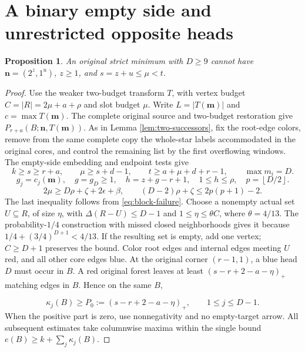 \documentclass[11pt,a4paper]{article}
\newcommand{\nn}{\mathbf n}\newcommand{\mm}{\mathbf m}
\newcommand{\floor}[1]{\left\lfloor#1\right\rfloor}
\newtheorem{proposition}[theorem]{Proposition}
\theoremstyle{definition}
\begin{document}
\section{A binary empty side and unrestricted opposite heads}\label{app:binary-empty}
\begin{proposition}\label{prop:binary-empty}
An original strict minimum with $D\ge9$ cannot have
$\nn=(2^z,1^u)$, $z\ge1$, and $s=z+u\le\mu<t$.
\end{proposition}
\begin{proof}
Use the weaker two-budget transform $T$, with vertex budget $C=|R|=2\mu+a+\rho$ and slot budget $\mu$.
Write $L=|T(\mm)|$ and $c=\max T(\mm)$.
The complete original source and two-budget restoration give
$P_{r+a}(B;\nn,T(\mm))$.
As in Lemma \ref{lem:two-successors}, fix the root-edge colors, remove from the same complete copy the whole-star labels accommodated in the original cores, and control the remaining list by the first overflowing windows.
The empty-side embedding and endpoint tests give
\begin{equation}\label{eq:binary-empty-guards}
 k\ge s\ge r+a,\qquad \mu\ge s+d-1,\qquad
 t\ge a+\mu+d+r-1,\qquad \max m_i=D.
\end{equation}
\[
 g_j=c_j(\mm),\quad g=g_D\ge1,\quad
 h=z+g-r+1,\quad 1\le h\le\rho,\quad p=\floor{D/2}.
\]
\[
 2\mu\ge D\rho+\zeta+2\epsilon+\beta,\qquad
 (D-2)\rho+\zeta\le2p(p+1)-2.
\]
The last inequality follows from \eqref{eq:block-failure}.
Choose a nonempty actual set $U\subseteq R$, of size $\eta$, with
$\Delta(R-U)\le D-1$ and $1\le\eta\le\theta C$, where $\theta=4/13$.
The probability-$1/4$ construction with missed closed neighborhoods gives it because
$1/4+(3/4)^{D+1}<4/13$.
If the resulting set is empty, add one vertex; $C\ge D+1$ preserves the bound.
Color root edges and internal edges meeting $U$ red, and all other core edges blue.
At the original corner $(r-1,1)$, a blue head $D$ must occur in $B$.
A red original forest leaves at least $(s-r+2-a-\eta)_+$ matching edges in $B$.
Hence on the same $B$,

\begin{equation}\label{eq:binary-empty-repair}
 \kappa_j(B)\ge P_0:=(s-r+2-a-\eta)_+,\qquad1\le j\le D-1.
\end{equation}
When the positive part is zero, use nonnegativity and no empty-target arrow.
All subsequent estimates take columnwise maxima within the single bound
$e(B)\ge k+\sum_j\kappa_j(B)$.


\end{proof}
\end{document}
